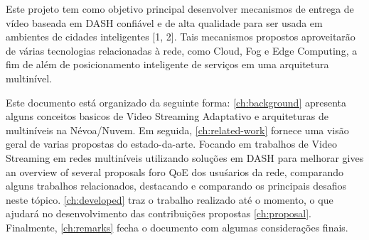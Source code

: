 


 
Este projeto tem como objetivo principal desenvolver mecanismos de entrega de vídeo baseada em DASH confiável e de alta qualidade para ser usada em ambientes de cidades inteligentes [1, 2]. Tais mecanismos propostos aproveitarão de várias tecnologias relacionadas à rede, como Cloud, Fog e Edge Computing, a fim de além de posicionamento inteligente de serviços em uma arquitetura multinível. %

Este documento está organizado da seguinte forma: \autoref{ch:background} apresenta
alguns conceitos basicos de Video Streaming Adaptativo e arquiteturas de multiníveis na Névoa/Nuvem. Em seguida, \autoref{ch:related-work} fornece uma visão geral de varias propostas 
do estado-da-arte. Focando em trabalhos de Video Streaming em redes multiníveis utilizando soluções em DASH para melhorar gives an overview of several proposals foro QoE dos usuśarios da rede, comparando alguns trabalhos relacionados, destacando e comparando os principais desafios neste tópico. \autoref{ch:developed} traz o trabalho realizado até o momento, o que ajudará no desenvolvimento das contribuições propostas \autoref{ch:proposal}. Finalmente, \autoref{ch:remarks} fecha o documento com algumas considerações finais.
 
